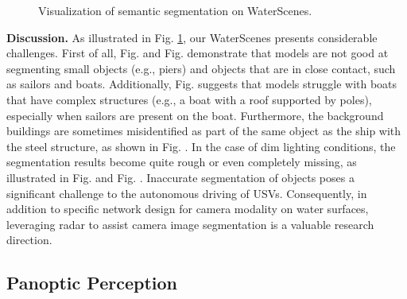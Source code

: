 \documentclass[lettersize,journal]{IEEEtran}
\begin{document}
\begin{figure}[h]
\centering
{}
\quad
\hspace{-6.6mm}
\quad
\hspace{-6.6mm}
\vspace{-2mm}

\centering
{}
\quad
\hspace{-6.6mm}
\quad
\hspace{-6.6mm}
\caption{Visualization of semantic segmentation on WaterScenes.}
\label{fig:semantic}
\end{figure}


\textbf{Discussion.} As illustrated in Fig. \ref{fig:semantic}, our WaterScenes presents considerable challenges. 
First of all, Fig.  and Fig.  demonstrate that models are not good at segmenting small objects (e.g., piers) and objects that are in close contact, such as sailors and boats.
Additionally, Fig.  suggests that models struggle with boats that have complex structures (e.g., a boat with a roof supported by poles), especially when sailors are present on the boat.
Furthermore, the background buildings are sometimes misidentified as part of the same object as the ship with the steel structure, as shown in Fig. .
In the case of dim lighting conditions, the segmentation results become quite rough or even completely missing, as illustrated in Fig.  and Fig. .
Inaccurate segmentation of objects poses a significant challenge to the autonomous driving of USVs. 
Consequently, in addition to specific network design for camera modality on water surfaces, leveraging radar to assist camera image segmentation is a valuable research direction.



\subsection{Panoptic Perception}
\end{document}
